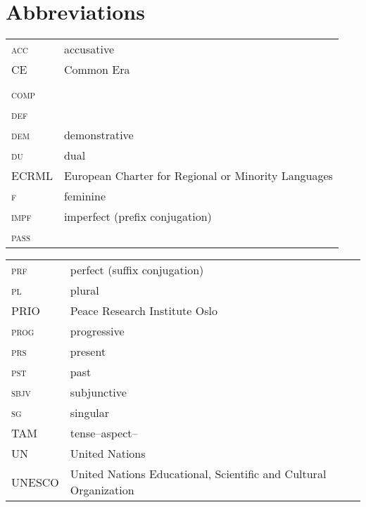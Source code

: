 \documentclass[output=paper]{langsci/langscibook}
\begin{document}
\section*{Abbreviations}
\begin{tabularx}{.5\textwidth}{@{}lQ@{}}
\textsc{acc} & accusative\\
CE & Common Era\\
 &  \\
\textsc{comp} & \\
\textsc{def} & \\
\textsc{dem} & demonstrative\\
\textsc{du} & dual\\
ECRML & European Charter for Regional or Minority Languages\\
\textsc{f} & feminine\\
\textsc{impf} & imperfect (prefix conjugation)\\
\textsc{pass} & \\
\end{tabularx}%
\begin{tabularx}{.5\textwidth}{@{}lQ@{}}
\textsc{prf} & perfect (suffix conjugation)\\
\textsc{pl} & plural\\
PRIO & Peace Research Institute Oslo\\
\textsc{prog} & progressive \\
\textsc{prs} & present\\
\textsc{pst} & past \\
\textsc{sbjv} & subjunctive\\
\textsc{sg} & singular\\
TAM & tense--aspect--\\
UN & United Nations\\
UNESCO & United Nations Educational, Scientific and Cultural Organization
\end{tabularx}%


{\sloppy\printbibliography[heading=subbibliography,notkeyword=this]}
\end{document}
